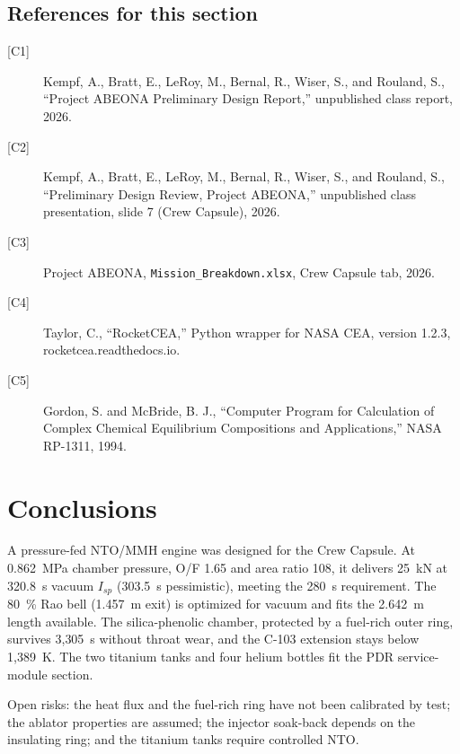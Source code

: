 \documentclass[10pt]{article}
\newcommand{\NIspD}{320.8}
\newcommand{\NIspP}{303.5}
\newcommand{\NEPS}{108}
\newcommand{\NDe}{1.457}
\newcommand{\NLavail}{2.642}
\newcommand{\Ntdesign}{3{,}305}
\newcommand{\NTmaxExt}{1{,}389}
\begin{document}
\subsection*{References for this section}
{\small\begin{description}
\item[{[C1]}] Kempf, A., Bratt, E., LeRoy, M., Bernal, R., Wiser, S., and Rouland, S., ``Project ABEONA Preliminary Design Report,'' unpublished class report, 2026.
\item[{[C2]}] Kempf, A., Bratt, E., LeRoy, M., Bernal, R., Wiser, S., and Rouland, S., ``Preliminary Design Review, Project ABEONA,'' unpublished class presentation, slide 7 (Crew Capsule), 2026.
\item[{[C3]}] Project ABEONA, \texttt{Mission\_Breakdown.xlsx}, Crew Capsule tab, 2026.
\item[{[C4]}] Taylor, C., ``RocketCEA,'' Python wrapper for NASA CEA, version 1.2.3, rocketcea.readthedocs.io.
\item[{[C5]}] Gordon, S. and McBride, B. J., ``Computer Program for Calculation of Complex Chemical Equilibrium Compositions and Applications,'' NASA RP-1311, 1994.
\end{description}}

\section{Conclusions}
A pressure-fed NTO/MMH engine was designed for the Crew Capsule. At 0.862~MPa chamber pressure, O/F 1.65 and area ratio
\NEPS, it delivers 25~kN at \NIspD~s vacuum $I_{sp}$ (\NIspP~s pessimistic), meeting the 280~s requirement. The 80~\% Rao bell
(\NDe~m exit) is optimized for vacuum and fits the \NLavail~m length available. The silica-phenolic chamber, protected
by a fuel-rich outer ring, survives \Ntdesign~s without throat wear, and the C-103 extension stays below \NTmaxExt~K. The
two titanium tanks and four helium bottles fit the PDR service-module section.

Open risks: the heat flux and the fuel-rich ring have not been calibrated by test; the ablator properties are assumed;
the injector soak-back depends on the insulating ring; and the titanium tanks require controlled NTO.
\end{document}
